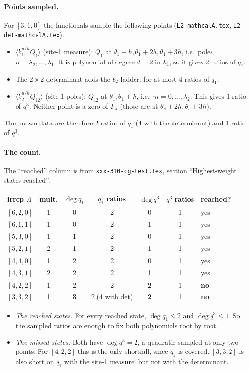 \documentclass[11pt]{article}
\newcommand{\nb}[1]{\texttt{#1}}
\theoremstyle{definition}
\theoremstyle{remark}
\begin{document}
\paragraph{Points sampled.} For $[3,1,0]$ the functionals sample the following points (\nb{L2-mathcalA.tex}, \nb{L2-det-mathcalA.tex}).
\begin{itemize}
\item $\langle k_1^{u/h}Q_1\rangle$ (site-1 measure): $Q_1$ at $\theta_1+h,\theta_1+2h,\theta_1+3h$, i.e.\ poles $n=\lambda_2,\dots,\lambda_1$. It is polynomial of degree $d=2$ in $k_1$, so it gives 2 ratios of $q_1$.
\item The $2\times2$ determinant adds the $\theta_2$ ladder, for at most 4 ratios of $q_1$.
\item $\langle k_2^{u/h}Q_{12}\rangle$ (site-1 poles): $Q_{12}$ at $\theta_1,\theta_1+h$, i.e.\ $m=0,\dots,\lambda_2$. This gives 1 ratio of $q^3$. Neither point is a zero of $F_\lambda$ (those are at $\theta_s+2h,\theta_s+3h$).
\end{itemize}
The known data are therefore 2 ratios of $q_1$ (4 with the determinant) and 1 ratio of $q^3$.

\paragraph{The count.} The ``reached'' column is from \nb{xxx-310-cg-test.tex}, section ``Highest-weight states reached''.
\begin{center}
\begin{tabular}{lcccccl}\toprule
irrep $\Lambda$ & mult. & $\deg q_1$ & $q_1$ ratios & $\deg q^3$ & $q^3$ ratios & reached?\\\midrule
$[6,2,0]$ & 1 & 0 & 2 & 0 & 1 & yes\\
$[6,1,1]$ & 1 & 0 & 2 & 1 & 1 & yes\\
$[5,3,0]$ & 1 & 1 & 2 & 0 & 1 & yes\\
$[5,2,1]$ & 2 & 1 & 2 & 1 & 1 & yes\\
$[4,4,0]$ & 1 & 2 & 2 & 0 & 1 & yes\\
$[4,3,1]$ & 2 & 2 & 2 & 1 & 1 & yes\\
$[4,2,2]$ & 1 & 2 & 2 & \textbf{2} & 1 & \textbf{no}\\
$[3,3,2]$ & 1 & \textbf{3} & 2 (4 with det) & \textbf{2} & 1 & \textbf{no}\\\bottomrule
\end{tabular}
\end{center}
\begin{itemize}
\item \emph{The reached states.} For every reached state, $\deg q_1\le2$ and $\deg q^3\le1$. So the sampled ratios are enough to fix both polynomials root by root.
\item \emph{The missed states.} Both have $\deg q^3=2$, a quadratic sampled at only two points. For $[4,2,2]$ this is the only shortfall, since $q_1$ is covered. $[3,3,2]$ is also short on $q_1$ with the site-1 measure, but not with the determinant.
\end{itemize}
\end{document}
